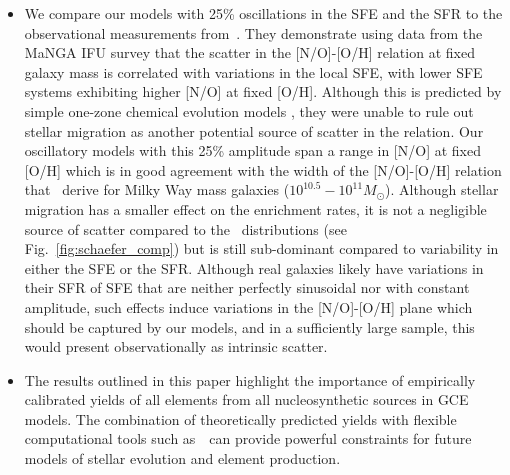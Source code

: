 \documentclass[ms.tex]{subfiles}
\begin{document}
\begin{itemize}
	\item We compare our models with 25\% oscillations in the SFE and the SFR
	to the observational measurements from~\citet{Schaefer2020}.
	They demonstrate using data from the MaNGA IFU survey that the scatter in
	the [N/O]-[O/H] relation at fixed galaxy mass is correlated with variations
	in the local SFE, with lower SFE systems exhibiting higher [N/O] at fixed
	[O/H].
	Although this is predicted by simple one-zone chemical evolution models
	\citep[e.g.][]{Molla20016, Vincenzo2016a}, they were unable to rule out
	stellar migration as another potential source of scatter in the relation.
	Our oscillatory models with this 25\% amplitude span a range in [N/O] at
	fixed [O/H] which is in good agreement with the width of the [N/O]-[O/H]
	relation that~\citet{Schaefer2020} derive for Milky Way mass galaxies
	($10^{10.5} - 10^{11} M_\odot$).
	Although stellar migration has a smaller effect on the enrichment rates, it
	is not a negligible source of scatter compared to the~\citet{Schaefer2020}
	distributions (see Fig.~\ref{fig:schaefer_comp}) but is still sub-dominant
	compared to variability in either the SFE or the SFR.
	Although real galaxies likely have variations in their SFR of SFE that are
	neither perfectly sinusoidal nor with constant amplitude, such effects
	induce variations in the [N/O]-[O/H] plane which should be captured by our
	models, and in a sufficiently large sample, this would present
	observationally as intrinsic scatter.

	\item The results outlined in this paper highlight the importance of 
	empirically calibrated yields of all elements from all nucleosynthetic 
	sources in GCE models. 
	The combination of theoretically predicted yields with flexible 
	computational tools such as~\vice~can provide powerful constraints for 
	future models of stellar evolution and element production. 
\end{itemize} 
\end{document}
